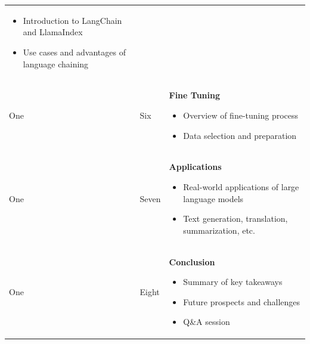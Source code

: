 \documentclass[a4paper, 11pt]{article}
\begin{document}
\begin{center}
\begin{tabular}{ |p{1cm}|p{1cm}||p{10cm}|  }
\begin{itemize}[topsep=0pt, partopsep=0pt, itemsep=0pt, parsep=0pt]
\item Introduction to LangChain and LlamaIndex
\item Use cases and advantages of language chaining
\end{itemize}
\\
One 	&   	Six		&   	\textbf{Fine Tuning} 
\begin{itemize}[topsep=0pt, partopsep=0pt, itemsep=0pt, parsep=0pt]
\item Overview of fine-tuning process
\item Data selection and preparation
\end{itemize}
\\
One	&  	Seven    	&  	\textbf{Applications}
\begin{itemize}[topsep=0pt, partopsep=0pt, itemsep=0pt, parsep=0pt]
\item Real-world applications of large language models
\item Text generation, translation, summarization, etc.
\end{itemize}
\\
One 	&   	Eight  	&   	\textbf{Conclusion} 
\begin{itemize}[topsep=0pt, partopsep=0pt, itemsep=0pt, parsep=0pt]
\item Summary of key takeaways
\item Future prospects and challenges
\item Q\&A session
\end{itemize}
\\
 \hline
\end{tabular}
\end{center}
\end{document}
